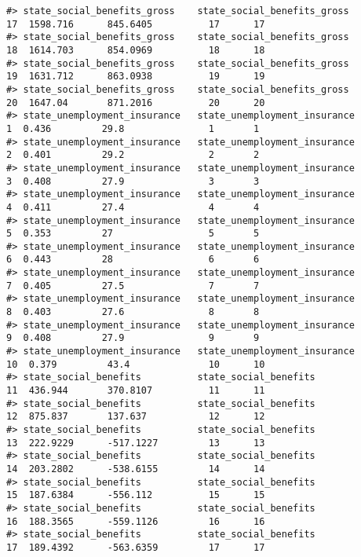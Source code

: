 \documentclass[
]{article}
\begin{document}
\begin{verbatim}
#> state_social_benefits_gross    state_social_benefits_gross                17  1598.716      845.6405          17      17
#> state_social_benefits_gross    state_social_benefits_gross                18  1614.703      854.0969          18      18
#> state_social_benefits_gross    state_social_benefits_gross                19  1631.712      863.0938          19      19
#> state_social_benefits_gross    state_social_benefits_gross                20  1647.04       871.2016          20      20
#> state_unemployment_insurance   state_unemployment_insurance                1  0.436         29.8               1       1
#> state_unemployment_insurance   state_unemployment_insurance                2  0.401         29.2               2       2
#> state_unemployment_insurance   state_unemployment_insurance                3  0.408         27.9               3       3
#> state_unemployment_insurance   state_unemployment_insurance                4  0.411         27.4               4       4
#> state_unemployment_insurance   state_unemployment_insurance                5  0.353         27                 5       5
#> state_unemployment_insurance   state_unemployment_insurance                6  0.443         28                 6       6
#> state_unemployment_insurance   state_unemployment_insurance                7  0.405         27.5               7       7
#> state_unemployment_insurance   state_unemployment_insurance                8  0.403         27.6               8       8
#> state_unemployment_insurance   state_unemployment_insurance                9  0.408         27.9               9       9
#> state_unemployment_insurance   state_unemployment_insurance               10  0.379         43.4              10      10
#> state_social_benefits          state_social_benefits                      11  436.944       370.8107          11      11
#> state_social_benefits          state_social_benefits                      12  875.837       137.637           12      12
#> state_social_benefits          state_social_benefits                      13  222.9229      -517.1227         13      13
#> state_social_benefits          state_social_benefits                      14  203.2802      -538.6155         14      14
#> state_social_benefits          state_social_benefits                      15  187.6384      -556.112          15      15
#> state_social_benefits          state_social_benefits                      16  188.3565      -559.1126         16      16
#> state_social_benefits          state_social_benefits                      17  189.4392      -563.6359         17      17

\end{verbatim}
\end{document}
